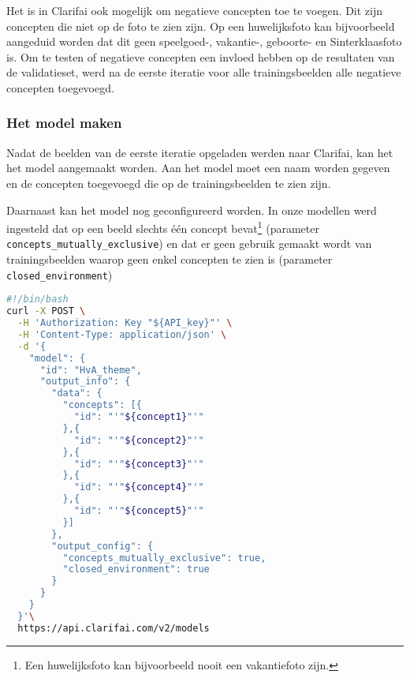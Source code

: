 Het is in Clarifai ook mogelijk om negatieve concepten toe te voegen. Dit zijn concepten die niet op de foto te zien zijn. Op een huwelijksfoto kan bijvoorbeeld aangeduid worden dat dit geen speelgoed-, vakantie-, geboorte- en Sinterklaasfoto is. Om te testen of negatieve concepten een invloed hebben op de resultaten van de validatieset, werd na de eerste iteratie voor alle trainingsbeelden alle negatieve concepten toegevoegd.

\subsubsection{Het model maken}
\label{subsubsec:model-maken}

Nadat de beelden van de eerste iteratie opgeladen werden naar Clarifai, kan het  het model aangemaakt worden. Aan het model moet een naam worden gegeven en de concepten toegevoegd die op de trainingsbeelden te zien zijn. 

Daarnaast kan het model nog geconfigureerd worden. In onze modellen werd ingesteld dat op een beeld slechts één concept bevat\footnote{Een huwelijksfoto kan bijvoorbeeld nooit een vakantiefoto zijn.} (parameter \texttt{concepts\_mutually\_exclusive}) en dat er geen gebruik gemaakt wordt van trainingsbeelden waarop geen enkel concepten te zien is (parameter \texttt{closed\_environment})

\begin{lstlisting}[language=bash,caption=bash commando om een custom model met vijf concepten te creëren]
#!/bin/bash
curl -X POST \
  -H 'Authorization: Key "${API_key}"' \
  -H 'Content-Type: application/json' \
  -d '{
    "model": {
      "id": "HvA_theme",
      "output_info": {
        "data": {
          "concepts": [{
            "id": "'"${concept1}"'"
          },{
            "id": "'"${concept2}"'"
          },{
            "id": "'"${concept3}"'"
          },{
            "id": "'"${concept4}"'"
          },{
            "id": "'"${concept5}"'"
          }]
        },
        "output_config": {
          "concepts_mutually_exclusive": true,
          "closed_environment": true
        }
      }
    }
  }'\
  https://api.clarifai.com/v2/models
\end{lstlisting}


